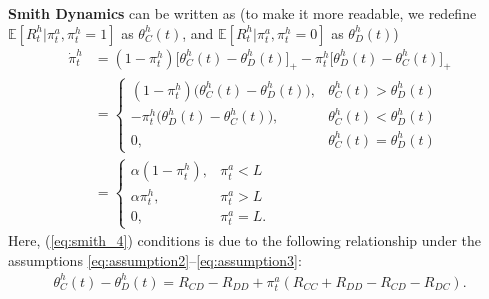 \documentclass[letterpaper]{article} %
\begin{document}
\textbf{Smith Dynamics} can be written as (to make it more readable, we redefine $\mathbb{E}[R^h_t|\pi^a_t, \pi^h_t = 1]$ as $\theta_C^h(t)$, and $\mathbb{E}[R^h_t|\pi^a_t, \pi^h_t = 0]$ as $\theta_D^h(t)$)
\begin{align}
\dot{\pi}^h_{t} &= (1-\pi^h_{t}) \bigg[\theta_C^h(t) - \theta_D^h(t) \bigg]_{+} - \pi^h_{t}\bigg[\theta_D^h(t) - \theta_C^h(t)  \bigg]_{+} \label{eq:smith_1} \\
&= 
\begin{cases}		 
	    (1-\pi^h_{t}) \bigg(\theta_C^h(t) - \theta_D^h(t) \bigg), & \theta_C^h(t) > \theta_D^h(t)\\
	    - \pi^h_{t}\bigg(\theta_D^h(t) - \theta_C^h(t)  \bigg), & \theta_C^h(t) < \theta_D^h(t)  \\
	    0, & \theta_C^h(t) = \theta_D^h(t)
\end{cases}	\label{eq:smith_2} \\ 
&=
\begin{cases}		 
	    \alpha (1-\pi_t^h), & \pi^a_t < L\\
	    \alpha \pi_t^h, &  \pi^a_t > L  \\
	    0, &\pi^a_t = L.
\end{cases}	 \label{eq:smith_4}
\end{align}
Here, (\ref{eq:smith_4}) conditions is due to the following relationship under the assumptions \eqref{eq:assumption2}--\eqref{eq:assumption3}:
\begin{align}
\label{eq:c_d_rel}
\theta_C^h(t) - \theta_D^h(t) =  R_{CD} - R_{DD} + \pi^a_t (R_{CC} +R_{DD}-R_{CD}-R_{DC}).
\end{align}
\end{document}
